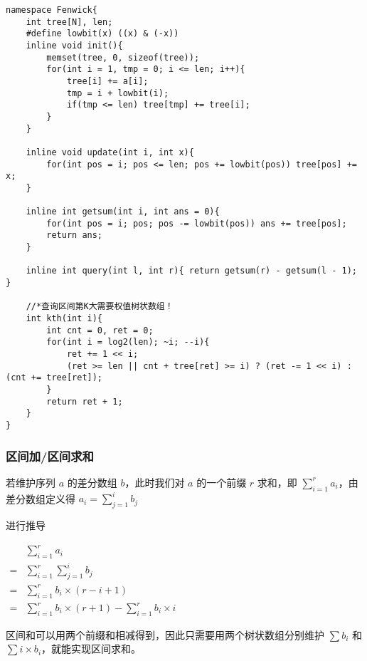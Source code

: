 \documentclass[]{article}
\begin{document}
\begin{verbatim}
namespace Fenwick{
    int tree[N], len;
    #define lowbit(x) ((x) & (-x))
    inline void init(){
        memset(tree, 0, sizeof(tree));
        for(int i = 1, tmp = 0; i <= len; i++){
            tree[i] += a[i];
            tmp = i + lowbit(i);
            if(tmp <= len) tree[tmp] += tree[i];
        }
    }

    inline void update(int i, int x){
        for(int pos = i; pos <= len; pos += lowbit(pos)) tree[pos] += x;
    }

    inline int getsum(int i, int ans = 0){
        for(int pos = i; pos; pos -= lowbit(pos)) ans += tree[pos];
        return ans;
    }

    inline int query(int l, int r){ return getsum(r) - getsum(l - 1); }

    //*查询区间第K大需要权值树状数组！
    int kth(int i){
        int cnt = 0, ret = 0;
        for(int i = log2(len); ~i; --i){
            ret += 1 << i;
            (ret >= len || cnt + tree[ret] >= i) ? (ret -= 1 << i) : (cnt += tree[ret]);
        }
        return ret + 1;
    }
}
\end{verbatim}

\hypertarget{ux533aux95f4ux52a0ux533aux95f4ux6c42ux548c}{%
\subsubsection{区间加/区间求和}\label{ux533aux95f4ux52a0ux533aux95f4ux6c42ux548c}}

若维护序列 \(a\) 的差分数组 \(b\)，此时我们对 \(a\) 的一个前缀 \(r\)
求和，即 \(\sum_{i=1}^{r} a_i\)，由差分数组定义得
\(a_i=\sum_{j=1}^i b_j\)

进行推导

\(\begin{aligned} &\sum_{i=1}^{r} a_i\\=&\sum_{i=1}^r\sum_{j=1}^i b_j\\=&\sum_{i=1}^r b_i\times(r-i+1) \\=&\sum_{i=1}^r b_i\times (r+1)-\sum_{i=1}^r b_i\times i \end{aligned}\)

区间和可以用两个前缀和相减得到，因此只需要用两个树状数组分别维护
\(\sum b_i\) 和 \(\sum i \times b_i\)，就能实现区间求和。
\end{document}
